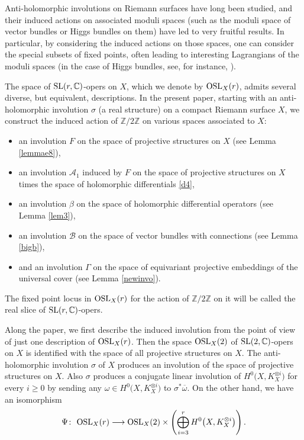 \documentclass[pdftex]{sigma}
\numberwithin{equation}{section}
\begin{document}
Anti-holomorphic involutions on Riemann surfaces have long been studied, and their induced
actions on associated moduli spaces (such as the moduli space of vector bundles or Higgs
bundles on them) have led to very fruitful results. In particular, by considering the
induced actions on those spaces, one can consider the special subsets of fixed points,
often leading to interesting Lagrangians of the moduli spaces (in the case of Higgs
bundles, see, for instance, \cite{real1,real2}).

The space of ${\rm SL}(r,\mathbb{C})$-opers on $X$, which we denote by ${\rm OSL}_X(r)$, admits several
diverse, but equivalent, descriptions. In the present paper, starting with an anti-holomorphic involution $\sigma$ (a real
structure) on a compact Riemann surface $X$, we construct the induced action of ${\mathbb Z}/2\mathbb Z$
on various spaces associated to $X$:
\begin{itemize}\itemsep=0pt
\item an involution $F$ on the space of projective structures on $X$ (see Lemma \ref{lemmae8}),
\item an involution $\mathcal A_1$ induced by $F$ on the space of projective structures on $X$ times the space of holomorphic differentials \eqref{d4},
\item an involution $\beta$ on
the space of holomorphic differential operators (see Lemma \ref{lem3}),
\item an involution $\mathcal B$ on the space of vector bundles with connections (see Lemma \ref{bigb}),
\item and an involution $\Gamma$ on the
space of equivariant projective embeddings of the universal cover (see Lemma \ref{newinvo}).
\end{itemize}
The fixed point locus in ${\rm OSL}_X(r)$ for the action of ${\mathbb Z}/2\mathbb Z$ on it will be called the
real slice of ${\rm SL}(r,{\mathbb C})$-opers.

Along the paper, we first describe the induced involution from the point of view of just one description of
${\rm OSL}_X(r)$.
Then the space ${\rm OSL}_X(2)$ of ${\rm SL}(2,{\mathbb C})$-opers on $X$ is identified with the space of all
projective structures on $X$. The anti-holomorphic involution $\sigma$ of $X$ produces
an involution of the space of projective structures on $X$. Also $\sigma$ produces a conjugate linear involution of
$H^0\bigl(X, K^{\otimes i}_X\bigr)$ for every $i \geq 0$ by sending any $\omega \in H^0\bigl(X, K^{\otimes i}_X\bigr)$
to $\sigma^*\overline{\omega}$. On the other hand, we have an isomorphism
\[
\Psi\colon\ {\rm OSL}_X(r) \longrightarrow {\rm OSL}_X(2)\times \left(\bigoplus_{i=3}^r H^0\bigl(X, K^{\otimes i}_X\bigr)\right).
\]
\end{document}
